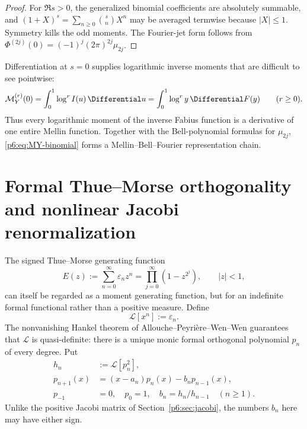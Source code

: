\documentclass[11pt]{article}
\theoremstyle{definition}
\theoremstyle{remark}
\newcommand{\eps}{\varepsilon}
\newcommand{\cL}{\mathcal L}
\begin{document}
\begin{proof}
For \(\Re s>0\), the generalized binomial coefficients are absolutely summable, and
\((1+X)^s=\sum_{n\ge0}\binom{s}{n}X^n\) may be averaged termwise because
\(|X|\le1\).  Symmetry kills the odd moments.  The Fourier-jet form follows from
\(\Phi^{(2j)}(0)=(-1)^j(2\pi)^{2j}\mu_{2j}\).
\end{proof}

Differentiation at \(s=0\) supplies logarithmic inverse moments that are difficult to see
pointwise:
\begin{equation}
 \mathcal M_Y^{(r)}(0)
 =\int_0^1\log^r I(u)\,\Differential u
 =\int_0^1\log^r y\,\Differential F(y)\qquad(r\ge0).                 \label{p6:eq:inverse-log-moments}
\end{equation}
Thus every logarithmic moment of the inverse Fabius function is a derivative of one entire
Mellin function.  Together with the Bell-polynomial formulas for \(\mu_{2j}\),
\eqref{p6:eq:MY-binomial} forms a Mellin--Bell--Fourier representation chain.

\section{Formal Thue--Morse orthogonality and nonlinear Jacobi renormalization}
\label{p6:sec:tm-formal-jacobi}

The signed Thue--Morse generating function
\begin{equation}
 E(z):=\sum_{n=0}^{\infty}\eps_nz^n
      =\prod_{j=0}^{\infty}(1-z^{2^j}),\qquad |z|<1,        \label{p6:eq:E-repeat}
\end{equation}
can itself be regarded as a moment generating function, but for an indefinite formal
functional rather than a positive measure.  Define
\begin{equation}
 \cL[x^n]:=\eps_n.                                  \label{p6:eq:L-tm}
\end{equation}
The nonvanishing Hankel theorem of Allouche--Peyri\`ere--Wen--Wen \cite{p6:APWW,p6:BugeaudHan} guarantees that
\(\cL\) is quasi-definite: there is a unique monic formal orthogonal polynomial
\(p_n\) of every degree.  Put
\begin{align}
 h_n&:=\cL[p_n^2],                                  \label{p6:eq:tm-hn}\\
 p_{n+1}(x)&=(x-a_n)p_n(x)-b_np_{n-1}(x),                  \label{p6:eq:tm-monic-rec}\\
 p_{-1}&=0,
 \quad p_0=1,
 \quad b_n=h_n/h_{n-1}\quad(n\ge1).                       \label{p6:eq:tm-bnorm}
\end{align}
Unlike the positive Jacobi matrix of Section~\ref{p6:sec:jacobi}, the numbers \(b_n\) here
may have either sign.
\end{document}
